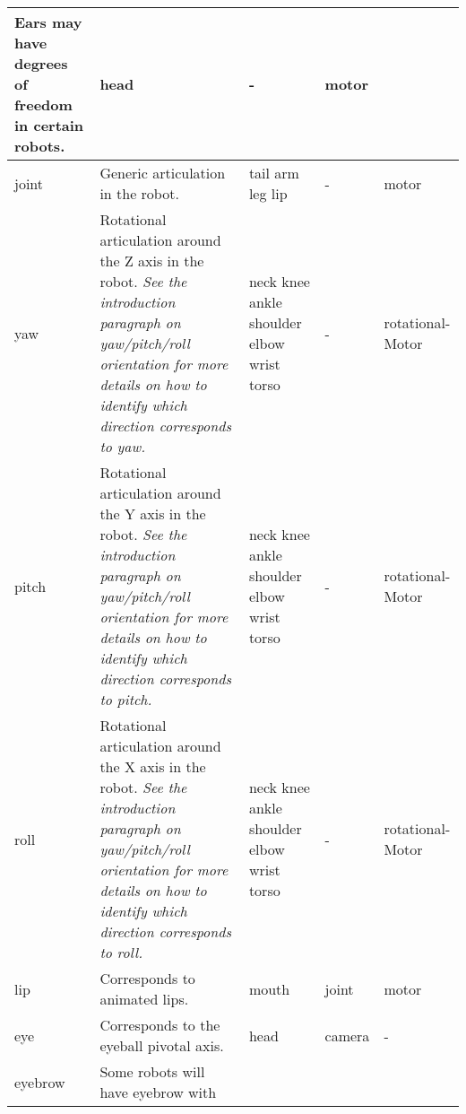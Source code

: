 \documentclass[a4paper]{article}
\begin{document}
\begin{center}
\begin{supertabular}{|m{2.312cm}|m{6.776cm}|m{2.629cm}|m{2.471cm}|m{2.1269999cm}|}
\sffamily Ears may have degrees of freedom in
certain robots. &
\ttfamily head &
\ttfamily {}- &
\ttfamily motor\\\hline
{} joint &
\sffamily Generic articulation in the robot. &
\ttfamily tail arm leg lip &
\ttfamily {}- &
\ttfamily motor\\\hline
{} yaw &
\sffamily Rotational articulation around the Z
axis in the robot. \textit{See the introduction paragraph on
yaw/pitch/roll orientation for more details on how to identify which
direction corresponds to yaw.} &
\ttfamily neck knee ankle shoulder elbow wrist
torso &
\ttfamily {}- &
\ttfamily rotational-Motor\\\hline
{} pitch &
\sffamily Rotational articulation around the Y
axis in the robot. \textit{See the introduction paragraph on
yaw/pitch/roll orientation for more details on how to identify which
direction corresponds to pitch.} &
\ttfamily neck knee ankle shoulder elbow wrist
torso &
\ttfamily {}- &
\ttfamily rotational-Motor\\\hline
{} roll &
\sffamily Rotational articulation around the X
axis in the robot. \textit{See the introduction paragraph on
yaw/pitch/roll orientation for more details on how to identify which
direction corresponds to roll.} &
\ttfamily neck knee ankle shoulder elbow wrist
torso &
\ttfamily {}- &
\ttfamily rotational-Motor\\\hline
{} lip &
\sffamily Corresponds to animated lips. &
\ttfamily mouth &
\ttfamily joint &
\ttfamily motor\\\hline
{} eye &
\sffamily Corresponds to the eyeball pivotal
axis. &
\ttfamily head &
\ttfamily camera &
\ttfamily {}-\\\hline
{} eyebrow &
\sffamily Some robots will have eyebrow with

\end{supertabular}
\end{center}
\end{document}
